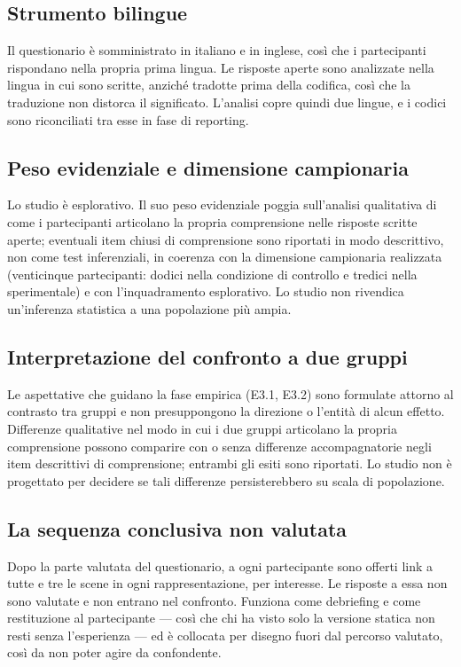 \subsection*{Strumento bilingue}
Il questionario è somministrato in italiano e in inglese, così che i partecipanti rispondano nella propria prima lingua. Le risposte aperte sono analizzate nella lingua in cui sono scritte, anziché tradotte prima della codifica, così che la traduzione non distorca il significato. L'analisi copre quindi due lingue, e i codici sono riconciliati tra esse in fase di reporting.

\subsection*{Peso evidenziale e dimensione campionaria}
Lo studio è esplorativo. Il suo peso evidenziale poggia sull'analisi qualitativa di come i partecipanti articolano la propria comprensione nelle risposte scritte aperte; eventuali item chiusi di comprensione sono riportati in modo descrittivo, non come test inferenziali, in coerenza con la dimensione campionaria realizzata (venticinque partecipanti: dodici nella condizione di controllo e tredici nella sperimentale) e con l'inquadramento esplorativo. Lo studio non rivendica un'inferenza statistica a una popolazione più ampia.

\subsection*{Interpretazione del confronto a due gruppi}
Le aspettative che guidano la fase empirica (E3.1, E3.2) sono formulate attorno al contrasto tra gruppi e non presuppongono la direzione o l'entità di alcun effetto. Differenze qualitative nel modo in cui i due gruppi articolano la propria comprensione possono comparire con o senza differenze accompagnatorie negli item descrittivi di comprensione; entrambi gli esiti sono riportati. Lo studio non è progettato per decidere se tali differenze persisterebbero su scala di popolazione.

\subsection*{La sequenza conclusiva non valutata}
Dopo la parte valutata del questionario, a ogni partecipante sono offerti link a tutte e tre le scene in ogni rappresentazione, per interesse. Le risposte a essa non sono valutate e non entrano nel confronto. Funziona come debriefing e come restituzione al partecipante --- così che chi ha visto solo la versione statica non resti senza l'esperienza --- ed è collocata per disegno fuori dal percorso valutato, così da non poter agire da confondente.

